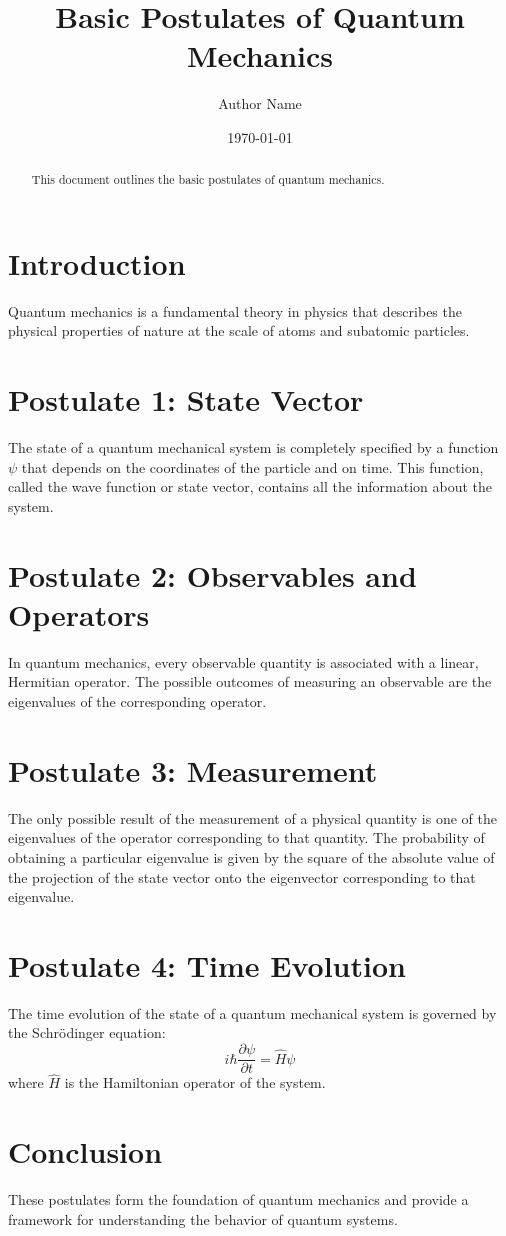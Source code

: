 \documentclass[12pt]{article}
\title{Basic Postulates of Quantum Mechanics}
\author{Author Name}
\date{\today}
\begin{document}
\maketitle

\begin{abstract}
This document outlines the basic postulates of quantum mechanics.
\end{abstract}

\section{Introduction}
Quantum mechanics is a fundamental theory in physics that describes the physical properties of nature at the scale of atoms and subatomic particles.

\section{Postulate 1: State Vector}
The state of a quantum mechanical system is completely specified by a function $\psi$ that depends on the coordinates of the particle and on time. This function, called the wave function or state vector, contains all the information about the system.

\section{Postulate 2: Observables and Operators}
In quantum mechanics, every observable quantity is associated with a linear, Hermitian operator. The possible outcomes of measuring an observable are the eigenvalues of the corresponding operator.

\section{Postulate 3: Measurement}
The only possible result of the measurement of a physical quantity is one of the eigenvalues of the operator corresponding to that quantity. The probability of obtaining a particular eigenvalue is given by the square of the absolute value of the projection of the state vector onto the eigenvector corresponding to that eigenvalue.

\section{Postulate 4: Time Evolution}
The time evolution of the state of a quantum mechanical system is governed by the Schrödinger equation:
\[
i\hbar \frac{\partial \psi}{\partial t} = \hat{H} \psi
\]
where $\hat{H}$ is the Hamiltonian operator of the system.

\section{Conclusion}
These postulates form the foundation of quantum mechanics and provide a framework for understanding the behavior of quantum systems.
\end{document}

